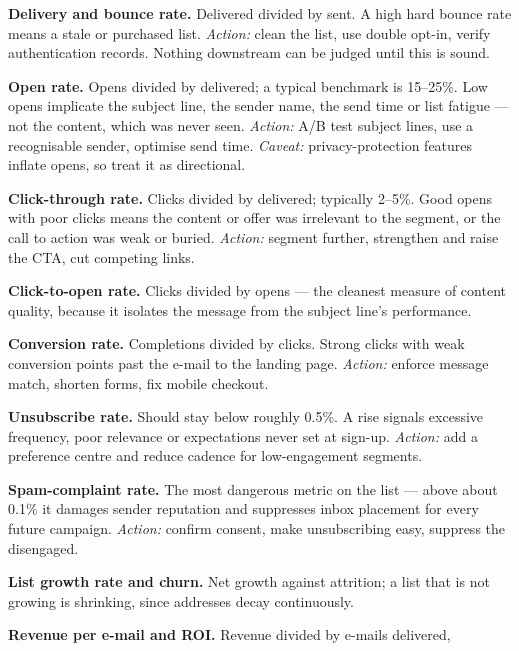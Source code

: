 \begin{qlist}
\begin{apts}
\item \textbf{Delivery and bounce rate.} Delivered divided by sent. A high hard
      bounce rate means a stale or purchased list. \emph{Action:} clean the
      list, use double opt-in, verify authentication records. Nothing downstream
      can be judged until this is sound.
\item \textbf{Open rate.} Opens divided by delivered; a typical benchmark is
      15--25\%. Low opens implicate the subject line, the sender name, the send
      time or list fatigue --- not the content, which was never seen.
      \emph{Action:} A/B test subject lines, use a recognisable sender, optimise
      send time. \emph{Caveat:} privacy-protection features inflate opens, so
      treat it as directional.
\item \textbf{Click-through rate.} Clicks divided by delivered; typically
      2--5\%. Good opens with poor clicks means the content or offer was
      irrelevant to the segment, or the call to action was weak or buried.
      \emph{Action:} segment further, strengthen and raise the CTA, cut
      competing links.
\item \textbf{Click-to-open rate.} Clicks divided by opens --- the cleanest
      measure of content quality, because it isolates the message from the
      subject line's performance.
\item \textbf{Conversion rate.} Completions divided by clicks. Strong clicks
      with weak conversion points past the e-mail to the landing page.
      \emph{Action:} enforce message match, shorten forms, fix mobile checkout.
\item \textbf{Unsubscribe rate.} Should stay below roughly 0.5\%. A rise signals
      excessive frequency, poor relevance or expectations never set at sign-up.
      \emph{Action:} add a preference centre and reduce cadence for
      low-engagement segments.
\item \textbf{Spam-complaint rate.} The most dangerous metric on the list ---
      above about 0.1\% it damages sender reputation and suppresses inbox
      placement for every future campaign. \emph{Action:} confirm consent,
      make unsubscribing easy, suppress the disengaged.
\item \textbf{List growth rate and churn.} Net growth against attrition; a list
      that is not growing is shrinking, since addresses decay continuously.
\item \textbf{Revenue per e-mail and ROI.} Revenue divided by e-mails delivered,

\end{apts}
\end{qlist}
